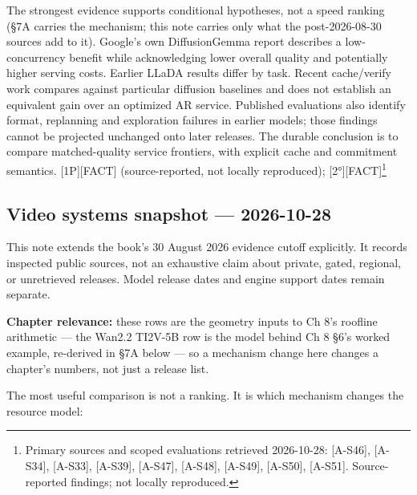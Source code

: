 The strongest evidence supports conditional hypotheses, not a speed
ranking (§7A carries the mechanism; this note carries only what the
post-2026-08-30 sources add to it). Google's own DiffusionGemma report
describes a low-concurrency benefit while acknowledging lower overall
quality and potentially higher serving costs. Earlier LLaDA results
differ by task. Recent cache/verify work compares against particular
diffusion baselines and does not establish an equivalent gain over an
optimized AR service. Published evaluations also identify format,
replanning and exploration failures in earlier models; those findings
cannot be projected unchanged onto later releases. The durable
conclusion is to compare matched-quality service frontiers, with
explicit cache and commitment semantics. \mbox{{[}1P{]}}\hspace{0pt}\mbox{{[}FACT{]}}
(source-reported, not locally reproduced); \mbox{{[}2°{]}}\hspace{0pt}\mbox{{[}FACT{]}}\footnote{Primary
  sources and scoped evaluations retrieved 2026-10-28: \mbox{{[}A-S46{]}},
  \mbox{{[}A-S34{]}}, \mbox{{[}A-S33{]}}, \mbox{{[}A-S39{]}}, \mbox{{[}A-S47{]}}, \mbox{{[}A-S48{]}},
  \mbox{{[}A-S49{]}}, \mbox{{[}A-S50{]}}, \mbox{{[}A-S51{]}}. Source-reported findings; not
  locally reproduced.}

\subsection*{Video systems snapshot ---
2026-10-28}\label{video-systems-snapshot-2026-10-28}

This note extends the book's 30 August 2026 evidence cutoff explicitly.
It records inspected public sources, not an exhaustive claim about
private, gated, regional, or unretrieved releases. Model release dates
and engine support dates remain separate.

\textbf{Chapter relevance:} these rows are the geometry inputs to Ch 8's
roofline arithmetic --- the Wan2.2 TI2V-5B row is the model behind Ch 8
§6's worked example, re-derived in §7A below --- so a mechanism change
here changes a chapter's numbers, not just a release list.

The most useful comparison is not a ranking. It is which mechanism
changes the resource model:

